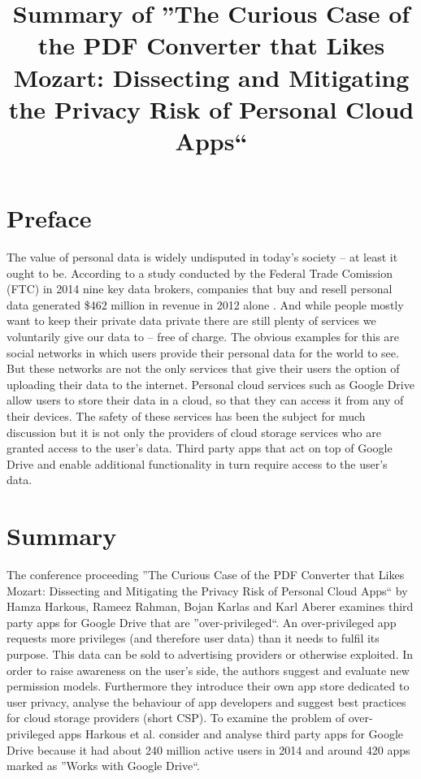 \documentclass[11pt,twocolumn,a4paper,DIV=calc]{scrartcl}
\begin{document}
\title{Summary of ''The Curious Case of the PDF Converter that Likes Mozart: Dissecting and Mitigating the Privacy Risk of Personal Cloud Apps``}
\date{}
\maketitle

\section{Preface}
The value of personal data is widely undisputed in today’s society – at least it ought to be. According to a study conducted by the Federal Trade Comission (FTC) in 2014 nine key data brokers, companies that buy and resell personal data generated \$462 million in revenue in 2012 alone \cite{FTCStudy}. And while people mostly want to keep their private data private \cite{WorthOfData} there are still plenty of services we voluntarily give our data to – free of charge. The obvious examples for this are social networks in which users provide their personal data for the world to see. But these networks are not the only services that give their users the option of uploading their data to the internet. Personal cloud services such as Google Drive allow users to store their data in a cloud, so that they can access it from any of their devices. The safety of these services has been the subject for much discussion \cite{CloudSecurity} but it is not only the providers of cloud storage services who are granted access to the user's data. Third party apps that act on top of Google Drive and enable additional functionality in turn require access to the user's data.
\section{Summary}
The conference proceeding ''The Curious Case of the PDF Converter that Likes Mozart: Dissecting and Mitigating the Privacy Risk of Personal Cloud Apps`` by Hamza Harkous, Rameez Rahman, Bojan Karlas and Karl Aberer \cite{Paper} examines third party apps for Google Drive that are ''over-privileged``. An over-privileged app requests more privileges (and therefore user data) than it needs to fulfil its purpose. This data can be sold to advertising providers or otherwise exploited. In order to raise awareness on the user's side, the authors suggest and evaluate new permission models. Furthermore they introduce their own app store dedicated to user privacy, analyse the behaviour of app developers and suggest best practices for cloud storage providers (short CSP). To examine the problem of over-privileged apps Harkous et al. consider and analyse third party apps for Google Drive because it had about 240 million active users in 2014 and around 420 apps marked as ''Works with Google Drive``. 
\end{document}
